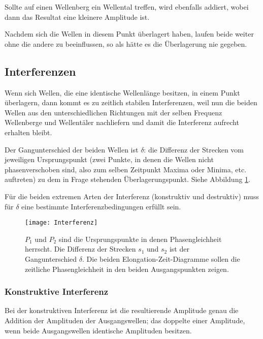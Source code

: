 Sollte auf einen Wellenberg ein Wellental treffen, wird ebenfalls addiert, wobei dann das Resultat eine kleinere Amplitude ist.

Nachdem sich die Wellen in diesem Punkt überlagert haben, laufen beide weiter ohne die andere zu beeinflussen, so als hätte es die Überlagerung nie gegeben.


\subsection{Interferenzen} \label{subsec:interferenz}

Wenn sich Wellen, die eine identische Wellenlänge besitzen, in einem Punkt überlagern, dann kommt es zu zeitlich stabilen Interferenzen, weil nun die beiden Wellen aus den unterschiedlichen Richtungen mit der selben Frequenz Wellenberge und Wellentäler \glqq nachliefern\grqq{} und damit die Interferenz aufrecht erhalten bleibt.

Der Gangunterschied der beiden Wellen ist $\delta$: die Differenz der Strecken vom jeweiligen Ursprungspunkt (zwei Punkte, in denen die Wellen nicht phasenverschoben sind, also zum selben Zeitpunkt Maxima oder Minima, etc. auftreten) zu dem in Frage stehenden Überlagerungspunkt. Siehe Abbildung \ref{fig:gangunterschied}.

Für die beiden extremen Arten der Interferenz (konstruktiv und destruktiv) muss für $\delta$ eine bestimmte Interferenzbedingungen erfüllt sein.
 
\begin{figure}
		\centering
		\texttt{[image: Interferenz]}
		\begin{comment} gnuplot './plot_noticszero.p'
set output 'plot_inteferenzhelper.png'
plot sin(x) ls 3
		\end{comment}
		\caption{$P_1$ und $P_2$ sind die Ursprungspunkte in denen Phasengleichheit herrscht. Die Differenz der Strecken $s_1$ und $s_2$ ist der Gangunterschied $\delta$. Die beiden Elongation-Zeit-Diagramme sollen die zeitliche Phasengleichheit in den beiden Ausgangspunkten zeigen.}
		\label{fig:gangunterschied}
\end{figure}

	\subsubsection{Konstruktive Interferenz}
	
	Bei der konstruktiven Interferenz ist die resultierende Amplitude genau die Addition der Amplituden der Ausgangswellen; das doppelte einer Amplitude, wenn beide Ausgangswellen identische Amplituden besitzen.
	
